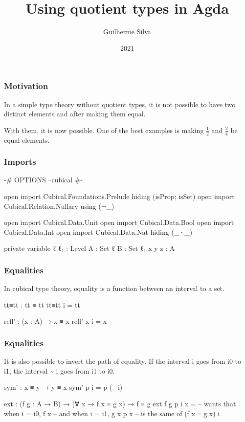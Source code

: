 \documentclass{beamer}
\title{Using quotient types in Agda}
\author{Guilherme Silva}
\date{2021}
\begin{document}
\frame{\titlepage}

\begin{frame}
  \frametitle{Motivation}
  In a simple type theory without quotient types,
  it is not possible to have two distinct elements and after
  making them equal.

  With them, it is now possible.
  One of the best examples is making $ \frac{1}{2} $ and $ \frac{2}{4} $ be equal elements.
\end{frame}

\begin{frame}
  \frametitle{Imports}
  \begin{code}
  {-# OPTIONS --cubical #-}

  open import Cubical.Foundations.Prelude hiding (isProp; isSet)
  open import Cubical.Relation.Nullary using (¬_)

  open import Cubical.Data.Unit
  open import Cubical.Data.Bool
  open import Cubical.Data.Int
  open import Cubical.Data.Nat hiding (_·_)

  private variable
    ℓ ℓ₁ : Level
    A : Set ℓ
    B : Set ℓ₁
    x y z : A
  \end{code}
\end{frame}

\begin{frame}
  \frametitle{Equalities}
  In cubical type theory, equality is a function between an interval to a set.
  \begin{code}
  tt≡tt : tt ≡ tt
  tt≡tt i = tt

  refl' : (x : A) → x ≡ x
  refl' x i = x
  \end{code}

\end{frame}

\begin{frame}
  \frametitle{Equalities}
  It is also possible to invert the path of equality.
  If the interval i goes from i0 to i1, the interval \~{} i goes from i1 to i0.

  \begin{code}
  sym' : x ≡ y → y ≡ x
  sym' p i = p (~ i)

  ext : (f g : A → B) → (∀ x → f x ≡ g x) → f ≡ g
  ext f g p i x = -- wants that when i = i0, f x
                  --        and when i = i1, g x
                  p x -- is the same of (f x ≡ g x)
                  i
  \end{code}

\end{frame}
\end{document}
